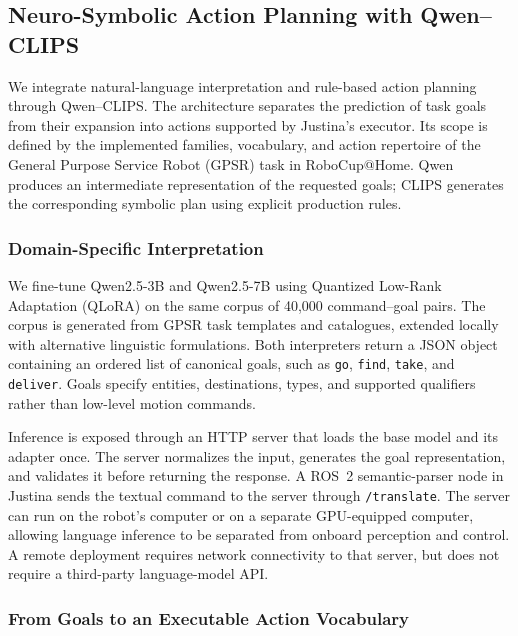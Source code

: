 \subsection{Neuro-Symbolic Action Planning with Qwen--CLIPS}
\label{sub:clips}

We integrate natural-language interpretation and rule-based action planning through Qwen--CLIPS. The architecture separates the prediction of task goals from their expansion into actions supported by Justina's executor. Its scope is defined by the implemented families, vocabulary, and action repertoire of the General Purpose Service Robot (GPSR) task in RoboCup@Home. Qwen produces an intermediate representation of the requested goals; CLIPS generates the corresponding symbolic plan using explicit production rules.

\subsubsection{Domain-Specific Interpretation}

We fine-tune Qwen2.5-3B and Qwen2.5-7B using Quantized Low-Rank Adaptation (QLoRA) on the same corpus of 40,000 command--goal pairs. The corpus is generated from GPSR task templates and catalogues, extended locally with alternative linguistic formulations. Both interpreters return a JSON object containing an ordered list of canonical goals, such as \texttt{go}, \texttt{find}, \texttt{take}, and \texttt{deliver}. Goals specify entities, destinations, types, and supported qualifiers rather than low-level motion commands.

Inference is exposed through an HTTP server that loads the base model and its adapter once. The server normalizes the input, generates the goal representation, and validates it before returning the response. A ROS~2 semantic-parser node in Justina sends the textual command to the server through \texttt{/translate}. The server can run on the robot's computer or on a separate GPU-equipped computer, allowing language inference to be separated from onboard perception and control. A remote deployment requires network connectivity to that server, but does not require a third-party language-model API.

\subsubsection{From Goals to an Executable Action Vocabulary}

